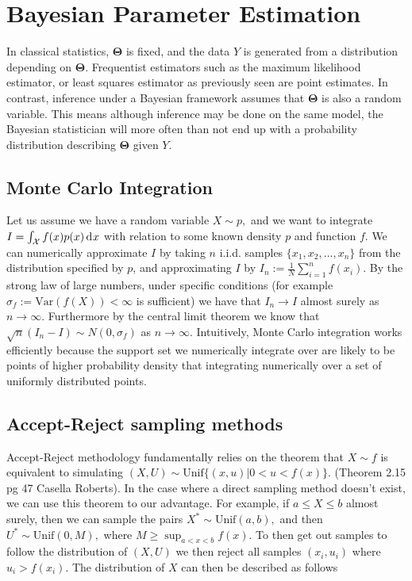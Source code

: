 \chapter{Bayesian Parameter Estimation}

In classical statistics, $\mathbf\Theta$ is fixed, and the data $Y$ is generated from a distribution depending on $\mathbf\Theta$. Frequentist estimators such as the maximum likelihood estimator, or least squares estimator as previously seen are point estimates. In contrast, inference under a Bayesian framework assumes that $\mathbf\Theta$ is also a random variable. This means although inference may be done on the same model, the Bayesian statistician will more often than not end up with a probability distribution describing $\mathbf\Theta$ given $Y$.

\color{red}
\section{Monte Carlo Integration}

Let us assume we have a random variable $X\sim p,$ and we want to integrate $I = \int_{\mathcal{X}} f(x)p(x)\diff x$ with relation to some known density $p$ and function $f$. We can numerically approximate $I$ by taking $n$ i.i.d. samples $\{x_1, x_2, \dots, x_n\}$ from the distribution specified by $p$, and approximating $I$ by $I_n:=\frac{1}{N}\sum_{i = 1}^nf(x_i).$ By the strong law of large numbers, under specific conditions (for example $\sigma_f := \mathrm{Var}(f(X))<\infty$ is sufficient) we have that $I_n \to I$ almost surely as $n\to\infty$. Furthermore by the central limit theorem we know that $\sqrt{n}(I_n - I) \sim N(0, \sigma_f)$ as $n\to\infty.$ Intuitively, Monte Carlo integration works efficiently because the support set we numerically integrate over are likely to be points of higher probability density that integrating numerically over a set of uniformly distributed points.

\color{black}
\section{Accept-Reject sampling methods}

Accept-Reject methodology fundamentally relies on the theorem that $X\sim f $ is equivalent to simulating $(X,U) \sim \mathrm{Unif}\{(x, u)|0<u<f(x)\}.$ (Theorem 2.15 pg 47 Casella Roberts). In the case where a direct sampling method doesn't exist, we can use this theorem to our advantage. For example, if $a \leq X \leq b$ almost surely, then we can sample the pairs $X^*\sim \mathrm{Unif}(a, b),$ and then $U^*\sim\mathrm{Unif}(0, M),$ where $M\geq \sup_{a<x<b} f(x).$ To then get out samples to follow the distribution of $(X, U)$ we then reject all samples $(x_i, u_i)$ where $u_i>f(x_i).$ The distribution of $X$ can then be described as follows

